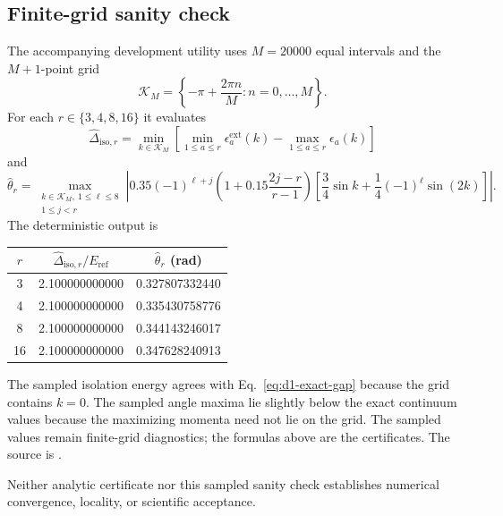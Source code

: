\subsection{Finite-grid sanity check}
The accompanying development utility uses $M=20000$ equal intervals and the
$M+1$-point grid
\begin{equation}
 \mathcal K_M=\left\{-\pi+\frac{2\pi n}{M}:n=0,\ldots,M\right\}.
\end{equation}
For each $r\in\{3,4,8,16\}$ it evaluates
\begin{equation}
 \widehat\Delta_{\mathrm{iso},r}
 =\min_{k\in\mathcal K_M}
 \left[\min_{1\leq a\leq r}\epsilon_a^{\mathrm{ext}}(k)
 -\max_{1\leq a\leq r}\epsilon_a(k)\right]
 \label{eq:d1-sampled-gap}
\end{equation}
and
\begin{equation}
 \widehat\theta_r
 =\max_{\substack{k\in\mathcal K_M,\ 1\leq\ell\leq8\\1\leq j<r}}
 \left|0.35(-1)^{\ell+j}
 \left(1+0.15\frac{2j-r}{r-1}\right)
 \left[\frac34\sin k+\frac14(-1)^\ell\sin(2k)\right]\right|.
 \label{eq:d1-sampled-angle}
\end{equation}
The deterministic output is
\begin{center}\small
\begin{tabular}{ccc}
\toprule
$r$ & $\widehat\Delta_{\mathrm{iso},r}/E_{\mathrm{ref}}$ & $\widehat\theta_r$ (rad) \\
\midrule
3  & 2.100000000000 & 0.327807332440 \\
4  & 2.100000000000 & 0.335430758776 \\
8  & 2.100000000000 & 0.344143246017 \\
16 & 2.100000000000 & 0.347628240913 \\
\bottomrule
\end{tabular}
\end{center}
The sampled isolation energy agrees with Eq.~\eqref{eq:d1-exact-gap} because the grid
contains $k=0$. The sampled angle maxima lie slightly below the exact continuum values
because the maximizing momenta need not lie on the grid. The sampled values remain
finite-grid diagnostics; the formulas above are the certificates. The source is
.

Neither analytic certificate nor this sampled sanity check establishes numerical
convergence, locality, or scientific acceptance.
